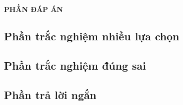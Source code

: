\documentclass[12pt,a4paper,openany,twoside]{book}
\begin{document}
\newpage

\begin{center}
	{\Large\bfseries\sffamily PHẦN ĐÁP ÁN}
\end{center}

\setcounter{subsection}{0}

\subsection{Phần trắc nghiệm nhiều lựa chọn}
\begin{flushleft}
	
\end{flushleft}

\subsection{Phần trắc nghiệm đúng sai}
\begin{flushleft}
	
\end{flushleft}

\subsection{Phần trả lời ngắn}
\begin{flushleft}
	
\end{flushleft}
\end{document}
